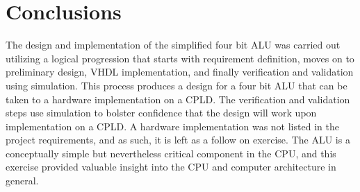 \documentclass{article}
\begin{document}
\section{Conclusions}
The design and implementation of the simplified four bit ALU was carried out utilizing
a logical progression that starts with requirement definition, moves on to preliminary design,
VHDL implementation, and finally verification and validation using simulation. This process
produces a design for a four bit ALU that can be taken to a hardware implementation on a 
CPLD. The verification and validation steps use simulation to bolster confidence that the 
design will work upon implementation on a CPLD. A hardware implementation was not listed in the
project requirements, and as such, it is left as a follow on exercise. The ALU is a conceptually
simple but nevertheless critical component in the CPU, and this exercise provided valuable
insight into the CPU and computer architecture in general.
\end{document}
